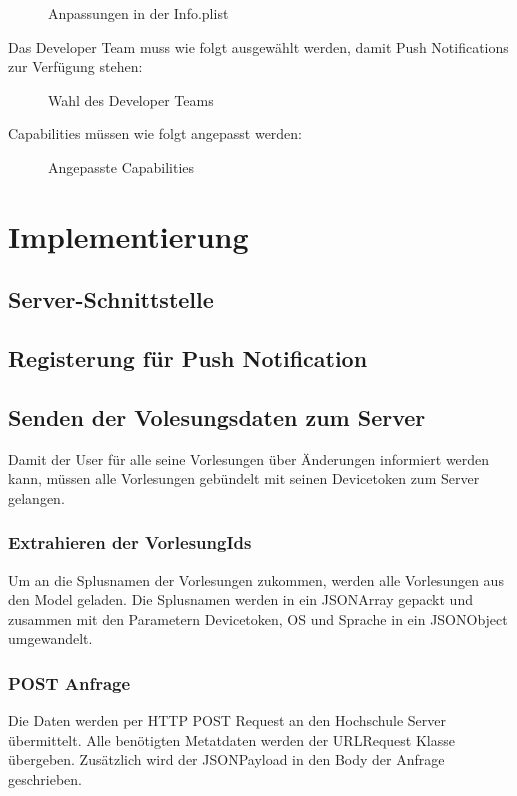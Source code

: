 \begin{figure}[H]
	\centering
	\caption{Anpassungen in der Info.plist}
	\label{plist}
\end{figure}


Das Developer Team muss wie folgt ausgewählt werden, damit Push Notifications zur Verfügung stehen:
\begin{figure}[H]
	\centering
	\caption{Wahl des Developer Teams}
	\label{devteam}
\end{figure}


Capabilities müssen wie folgt angepasst werden:

\begin{figure}[H]
	\centering
	\caption{Angepasste Capabilities}
	\label{capabilities}
\end{figure}

\section{Implementierung}
\subsection{Server-Schnittstelle}
\subsection{Registerung für Push Notification}
\subsection{Senden der Volesungsdaten zum Server}
Damit der User für alle seine Vorlesungen über Änderungen informiert werden kann, müssen alle Vorlesungen gebündelt mit seinen Devicetoken 
zum Server gelangen. 
\subsubsection{Extrahieren der VorlesungIds}
Um an die Splusnamen der Vorlesungen zukommen, werden alle Vorlesungen aus den Model geladen. Die Splusnamen werden in ein JSONArray
gepackt und zusammen mit den Parametern Devicetoken, OS und Sprache in ein JSONObject umgewandelt.

\subsubsection{POST Anfrage}
Die Daten werden per HTTP POST Request an den Hochschule Server übermittelt. Alle benötigten Metatdaten werden der URLRequest Klasse übergeben. Zusätzlich wird der JSONPayload in den Body der Anfrage geschrieben. 


